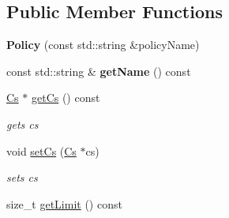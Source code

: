 \subsection*{Public Member Functions}
\begin{DoxyCompactItemize}
\item 
{\bfseries Policy} (const std\+::string \&policy\+Name)\hypertarget{classnfd_1_1cs_1_1Policy_a2e690af3047ceb479188cd4c83511b30}{}\label{classnfd_1_1cs_1_1Policy_a2e690af3047ceb479188cd4c83511b30}

\item 
const std\+::string \& {\bfseries get\+Name} () const\hypertarget{classnfd_1_1cs_1_1Policy_a8b4ffc93fcfe37f02babaed9725468c5}{}\label{classnfd_1_1cs_1_1Policy_a8b4ffc93fcfe37f02babaed9725468c5}

\item 
\hyperlink{classnfd_1_1cs_1_1Cs}{Cs} $\ast$ \hyperlink{classnfd_1_1cs_1_1Policy_a77aeb7bde79925d5880a45d420702613}{get\+Cs} () const\hypertarget{classnfd_1_1cs_1_1Policy_a77aeb7bde79925d5880a45d420702613}{}\label{classnfd_1_1cs_1_1Policy_a77aeb7bde79925d5880a45d420702613}

\begin{DoxyCompactList}\small\item\em gets cs \end{DoxyCompactList}\item 
void \hyperlink{classnfd_1_1cs_1_1Policy_a65e824d1a4d52782a7ca6f521af73c1c}{set\+Cs} (\hyperlink{classnfd_1_1cs_1_1Cs}{Cs} $\ast$cs)\hypertarget{classnfd_1_1cs_1_1Policy_a65e824d1a4d52782a7ca6f521af73c1c}{}\label{classnfd_1_1cs_1_1Policy_a65e824d1a4d52782a7ca6f521af73c1c}

\begin{DoxyCompactList}\small\item\em sets cs \end{DoxyCompactList}\item 
size\+\_\+t \hyperlink{classnfd_1_1cs_1_1Policy_a7297473f0524ef43630d21ba5344cdf8}{get\+Limit} () const\hypertarget{classnfd_1_1cs_1_1Policy_a7297473f0524ef43630d21ba5344cdf8}{}\label{classnfd_1_1cs_1_1Policy_a7297473f0524ef43630d21ba5344cdf8}


\end{DoxyCompactItemize}
